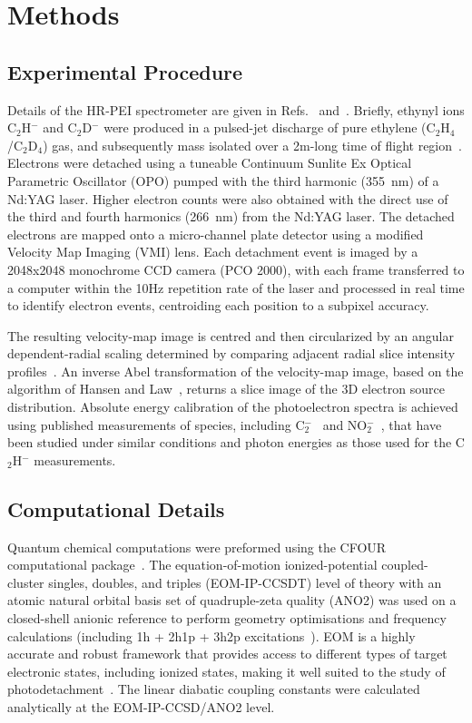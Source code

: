 \documentclass[aip,graphicx]{revtex4-1}
\begin{document}
\section{Methods}
\subsection{Experimental Procedure}
Details of the HR-PEI spectrometer are given in Refs.~ and~. Briefly, ethynyl ions C$_2$H$^-$ and C$_2$D$^-$ were produced in a pulsed-jet discharge of pure ethylene (C$_2$H$_4$/C$_2$D$_4$) gas, and subsequently mass isolated over a 2m-long time of flight region~\cite{ded01}. Electrons were detached using a tuneable Continuum Sunlite Ex Optical Parametric Oscillator (OPO) pumped with the third harmonic (355~nm) of a Nd:YAG laser. Higher electron counts were also obtained with the direct use of the third and fourth harmonics (266~nm) from the Nd:YAG laser. The detached electrons are mapped onto a micro-channel plate detector using a modified Velocity Map Imaging (VMI) lens. Each detachment event is imaged by a 2048x2048 monochrome CCD camera (PCO 2000), with each frame transferred to a computer within the 10Hz repetition rate of the laser and processed in real time to identify electron events, centroiding each position to a subpixel accuracy.

The resulting velocity-map image is centred and then circularized by an angular dependent-radial scaling determined by comparing adjacent radial slice intensity profiles~\cite{gas17}. An inverse Abel transformation of the velocity-map image, based on the algorithm of Hansen and Law~\cite{han85,hic19}, returns a slice image of the 3D electron source distribution. Absolute energy calibration of the photoelectron spectra is achieved using published measurements of species, including C$_2^-$~\cite{law19b} and NO$_2^-$~\cite{law19}, that have been studied under similar conditions and photon energies as those used for the C$_2$H$^-$ measurements.



\subsection{Computational Details}
Quantum chemical computations were preformed using the CFOUR computational package~\cite{dev20}. The equation-of-motion ionized-potential coupled-cluster singles, doubles, and triples (EOM-IP-CCSDT) level of theory with an atomic natural orbital basis set of quadruple-zeta quality (ANO2) was used on a closed-shell anionic reference to perform geometry optimisations and frequency calculations (including 1h + 2h1p + 3h2p excitations~\cite{mat16}). EOM is a highly accurate and robust framework that provides access to different types of target electronic states, including ionized states, making it well suited to the study of photodetachment~\cite{gul21b,and22,bar07}. The linear diabatic coupling constants were calculated analytically at the EOM-IP-CCSD/ANO2 level.
\end{document}
